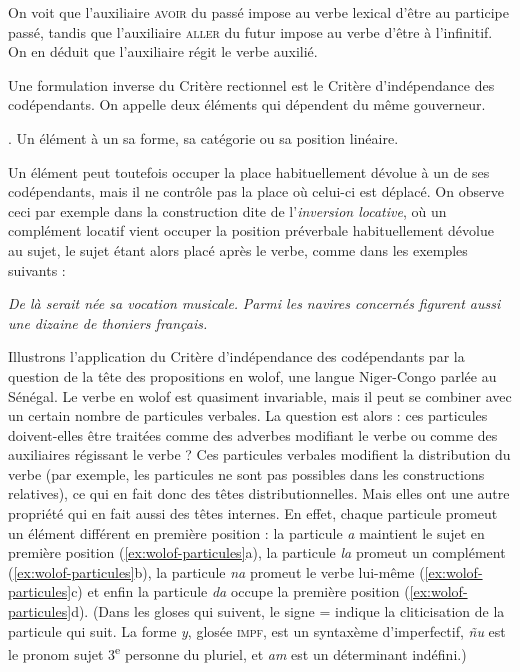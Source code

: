 On voit que l’auxiliaire \textsc{avoir} du passé impose au verbe lexical d’être au participe passé, tandis que l’auxiliaire \textsc{aller} du futur impose au verbe d’être à l’infinitif. On en déduit que l’auxiliaire régit le verbe auxilié.

Une formulation inverse du Critère rectionnel est le Critère d’indépendance des codépendants. On appelle  deux éléments qui dépendent du même gouverneur.

{. Un élément  à un  sa forme, sa catégorie ou sa position linéaire.}

Un élément peut toutefois occuper la place habituellement dévolue à un de ses codépendants, mais il ne contrôle pas la place où celui-ci est déplacé. On observe ceci par exemple dans la construction dite de l'\textit{inversion locative}, où un complément locatif vient occuper la position préverbale habituellement dévolue au sujet, le sujet étant alors placé après le verbe, comme dans les exemples suivants :

\ea
  \ea \textit{De là serait née sa vocation musicale.}
  \ex \textit{Parmi les navires concernés figurent aussi une dizaine de thoniers français.}
  \z
\z


Illustrons l'application du Critère d'indépendance des codépendants par la question de la tête des propositions en wolof, une langue Niger-Congo parlée au Sénégal. Le verbe en wolof est quasiment invariable, mais il peut se combiner avec un certain nombre de particules verbales. La question est alors : ces particules doivent-elles être traitées comme des adverbes modifiant le verbe ou comme des auxiliaires régissant le verbe ? Ces particules verbales modifient la distribution du verbe (par exemple, les particules ne sont pas possibles dans les constructions relatives), ce qui en fait donc des têtes distributionnelles. Mais elles ont une autre propriété qui en fait aussi des têtes internes. En effet, chaque particule promeut un élément différent en première position : la particule \textit{a} maintient le sujet en première position (\ref{ex:wolof-particules}a), la particule \textit{la} promeut un complément (\ref{ex:wolof-particules}b), la particule \textit{na} promeut le verbe lui-même (\ref{ex:wolof-particules}c) et enfin la particule \textit{da} occupe la première position (\ref{ex:wolof-particules}d). (Dans les gloses qui suivent, le signe = indique la cliticisation de la particule qui suit. La forme \textit{y}, glosée \textsc{impf}, est un syntaxème d'imperfectif, \textit{ñu} est le pronom sujet 3\textsuperscript{e} personne du pluriel, et \textit{am} est un déterminant indéfini.)


